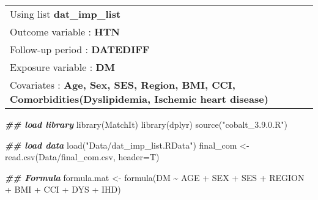 \documentclass[
]{book}
\newenvironment{Shaded}{\begin{snugshade}}{\end{snugshade}}
\newcommand{\AttributeTok}[1]{\textcolor[rgb]{0.77,0.63,0.00}{#1}}
\newcommand{\DocumentationTok}[1]{\textcolor[rgb]{0.56,0.35,0.01}{\textbf{\textit{#1}}}}
\newcommand{\FunctionTok}[1]{\textcolor[rgb]{0.00,0.00,0.00}{#1}}
\newcommand{\NormalTok}[1]{#1}
\newcommand{\OtherTok}[1]{\textcolor[rgb]{0.56,0.35,0.01}{#1}}
\newcommand{\SpecialCharTok}[1]{\textcolor[rgb]{0.00,0.00,0.00}{#1}}
\newcommand{\StringTok}[1]{\textcolor[rgb]{0.31,0.60,0.02}{#1}}
\theoremstyle{definition}
\theoremstyle{definition}
\theoremstyle{definition}
\theoremstyle{definition}
\theoremstyle{remark}
\begin{document}
\begin{longtable}[]{@{}l@{}}
\toprule()
\endhead
Using list \textbf{dat\_imp\_list} \\
Outcome variable : \textbf{HTN} \\
Follow-up period : \textbf{DATEDIFF} \\
Exposure variable : \textbf{DM} \\
Covariates : \textbf{Age, Sex, SES, Region, BMI, CCI, Comorbidities(Dyslipidemia, Ischemic heart disease)} \\
\bottomrule()
\end{longtable}

\begin{Shaded}
\begin{Highlighting}[]
\DocumentationTok{\#\# load library}
\FunctionTok{library}\NormalTok{(MatchIt)}
\FunctionTok{library}\NormalTok{(dplyr)}
\FunctionTok{source}\NormalTok{(}\StringTok{"cobalt\_3.9.0.R"}\NormalTok{)}
\end{Highlighting}
\end{Shaded}

\begin{Shaded}
\begin{Highlighting}[]
\DocumentationTok{\#\# load data}
\FunctionTok{load}\NormalTok{(}\StringTok{"Data/dat\_imp\_list.RData"}\NormalTok{)}
\NormalTok{final\_com }\OtherTok{\textless{}{-}} \FunctionTok{read.csv}\NormalTok{(}\StringTok{\textquotesingle{}Data/final\_com.csv\textquotesingle{}}\NormalTok{, }\AttributeTok{header=}\NormalTok{T)}
\end{Highlighting}
\end{Shaded}

\begin{Shaded}
\begin{Highlighting}[]
\DocumentationTok{\#\# Formula}
\NormalTok{formula.mat }\OtherTok{\textless{}{-}} \FunctionTok{formula}\NormalTok{(DM }\SpecialCharTok{\textasciitilde{}}\NormalTok{ AGE }\SpecialCharTok{+}\NormalTok{ SEX }\SpecialCharTok{+}\NormalTok{ SES }\SpecialCharTok{+}\NormalTok{ REGION }\SpecialCharTok{+}\NormalTok{ BMI }\SpecialCharTok{+}\NormalTok{ CCI }\SpecialCharTok{+}\NormalTok{ DYS }\SpecialCharTok{+}\NormalTok{ IHD)}
\end{Highlighting}
\end{Shaded}
\end{document}

